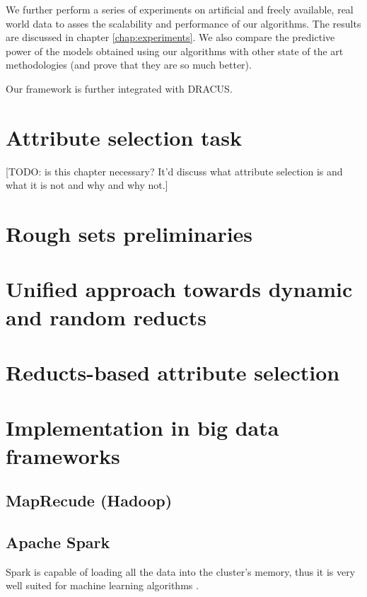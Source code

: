 \documentclass[12pt]{report}
\begin{document}
We further perform a series of experiments on artificial and freely available, real world data to asses the scalability and performance of our algorithms. The results are discussed in chapter \ref{chap:experiments}. We also compare the predictive power of the models obtained using our algorithms with other state of the art methodologies (and prove that they are so much better).

Our framework is further integrated with DRACUS.

\chapter{Attribute selection task}

[TODO: is this chapter necessary? It'd discuss what attribute selection is and what it is not and why and why not.]

\chapter{Rough sets preliminaries}
\label{chap:roughsets}


\chapter{Unified approach towards dynamic and random reducts}
\label{chap:dynamicrandomreducts}


\chapter{Reducts-based attribute selection}
\label{chap:reductsattrsel}
  
  
\chapter{Implementation in big data frameworks}
\label{chap:implattlsel}

\section{MapRecude (Hadoop)}

\section{Apache Spark}

Spark is capable of loading all the data into the cluster's memory, thus it is very well suited for machine learning algorithms \cite{zaharia}.
\end{document}
